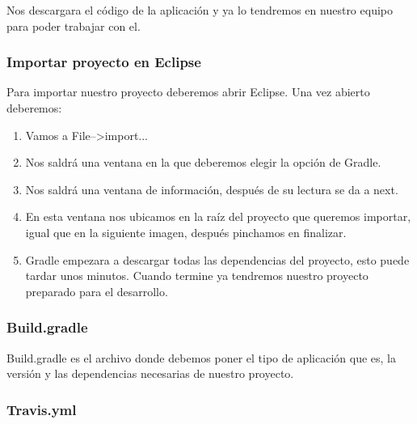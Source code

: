 
Nos descargara el código de la aplicación y ya lo tendremos en nuestro equipo para poder trabajar con el.

\subsubsection{Importar proyecto en Eclipse}\label{importar-proyecto-en-eclipse}

Para importar nuestro proyecto deberemos abrir Eclipse. Una vez abierto deberemos:

\begin{enumerate}
	\tightlist
	\item
	Vamos a File-->import...
	\item
	Nos saldrá una ventana en la que deberemos elegir la opción de Gradle.
	
	
	\item
	Nos saldrá una ventana de información, después de su lectura se da a next.
	
	\item
	En esta ventana nos ubicamos en la raíz del proyecto que queremos importar, igual que en la siguiente imagen, después pinchamos en finalizar.
	
	
	\item
	Gradle empezara a descargar todas las dependencias del proyecto, esto puede tardar unos minutos. Cuando termine ya tendremos nuestro proyecto preparado para el desarrollo.
		
	
	
\end{enumerate}

\subsubsection{Build.gradle}\label{buildgradle}

Build.gradle es el archivo donde debemos poner el tipo de aplicación que es, la versión y las dependencias necesarias de nuestro proyecto. \cite{gradle}

\subsubsection{Travis.yml}\label{travis-yml}

